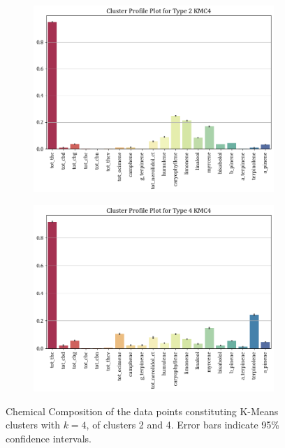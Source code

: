 \documentclass[11pt,a4paper]{article}
\begin{document}
\begin{figure}[H]
     \centering
     \begin{subfigure}[b]{0.475\textwidth}
         \centering
         \includegraphics[width=\textwidth]{images/km4_2.png}
         \label{fig:km4_2}
     \end{subfigure}
     \hfill
     \begin{subfigure}[b]{0.475\textwidth}
         \centering
         \includegraphics[width=\textwidth]{images/km4_4.png}
         \label{fig:km4_4}
     \end{subfigure}
    \caption{Chemical Composition of the data points constituting K-Means clusters with $k=4$, of clusters 2 and 4. Error bars indicate 95\% confidence intervals.}
    \label{fig:km4}
\end{figure}
\end{document}
